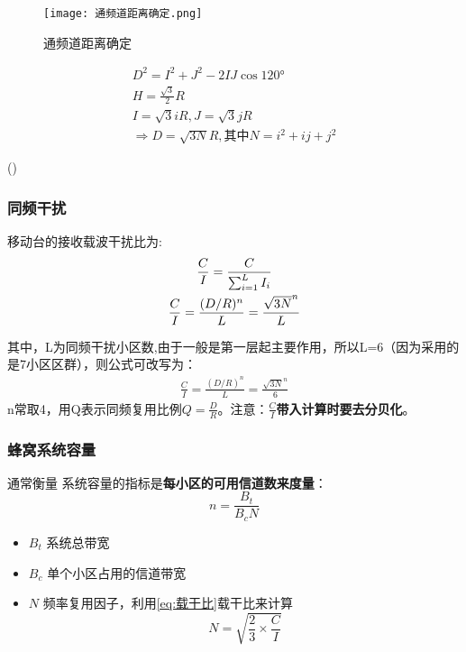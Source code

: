 	\begin{figure}[H]
		\centering
		\texttt{[image: 通频道距离确定.png]}
		\caption{通频道距离确定}
	\end{figure}
	\begin{minipage}[c]{0.8\linewidth}
			\begin{gather*}
		D^2 = I^2 + J^2 - 2IJ\cos120°	\\
		H = \frac{\sqrt{3}}{2}R	\\
		I = \sqrt{3}iR,J = \sqrt{3}jR	\\
		\Rightarrow 
		D = \sqrt{3N}R,\text{其中}N = i^2+ij+j^2
		\end{gather*} 
	\end{minipage}
	\begin{minipage}[r]{0.2\linewidth}
		(\theequation)
	\end{minipage}
	
	\subsubsection{同频干扰}
	移动台的接收载波干扰比为: \\

	\begin{gather}
		\frac{C}{I} = \frac{C}{\sum_{i=1}^{L}I_i} \notag  \\
		\frac{C}{I} = \frac{(D/R)^n}{L}=\frac{\sqrt{3N}^n}{L} 
		\label{eq:载干比}
	\end{gather}

	其中，L为同频干扰小区数,由于一般是第一层起主要作用，所以L=6（因为采用的是7小区区群），则公式可改写为：
	\begin{eqnarray}
	\frac{C}{I} = \frac{(D/R)^n}{L}=\frac{\sqrt{3N}^n}{6} 
	\end{eqnarray}
	n常取4，用Q表示同频复用比例$Q = \frac{D}{R}$。注意：\textbf{\(\frac{C}{I}\)带入计算时要去分贝化}。
	\subsubsection{蜂窝系统容量}
	通常衡量
	系统容量的指标是\textbf{每小区的可用信道数来度量}：
	\begin{equation}
		n = \frac{B_t}{B_cN}
	\end{equation}
	\begin{itemize}
		\item $B_t$ 系统总带宽
		\item $B_c$ 单个小区占用的信道带宽
		\item $N$ 频率复用因子，利用\ref{eq:载干比}载干比来计算
		\begin{equation*}
			N = \sqrt{\frac{2}{3}\times \frac{C}{I}}
		\end{equation*}
	\end{itemize}
		
